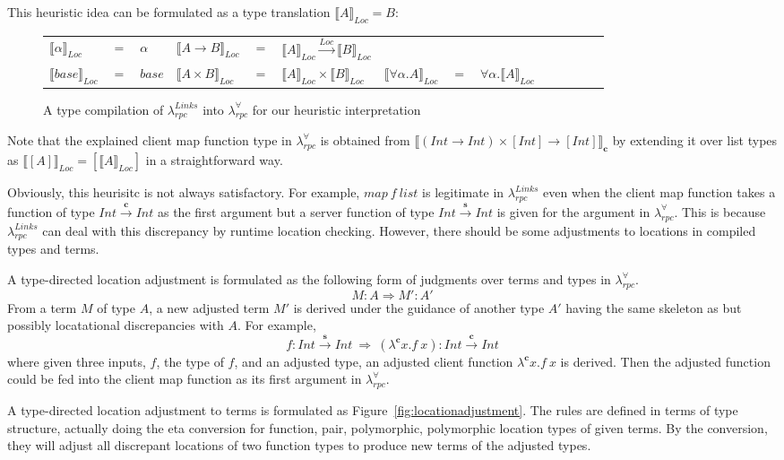 \documentclass[a4paper]{article}
\theoremstyle{plain}
\theoremstyle{definition}
\newcommand{\polyrpc}{$\lambda_{rpc}^{\forall}$\xspace}
\newcommand{\linksrpc}{$\lambda_{rpc}^{Links}$\xspace}
\newcommand{\client}{\textbf{c}}
\newcommand{\server}{\textbf{s}}
\newcommand{\lamL}[3]{\lambda^{#1}#2.#3}
\newcommand{\funL}[1]{\xrightarrow{#1}}
\newcommand{\linkstycomp}[2]{\llbracket#1\rrbracket_{#2}}
\newcommand{\adjcomp}[4]{#1:#2 \Rightarrow #3:#4}
\newcommand{\Loc}{Loc}
\begin{document}
%
This heuristic idea can be formulated as a type translation
$\linkstycomp{A}{\Loc} = B$:

\begin{figure}[h]
\centering
\begin{tabular}{l l l l l l l l l l l l l l}
$\linkstycomp{\alpha}{\Loc}$ & $=$ & $\alpha$
&
$\linkstycomp{A \funL{} B}{\Loc}$ & $=$ & $\linkstycomp{A}{\Loc} \funL{Loc} \linkstycomp{B}{\Loc}$
\\
$\linkstycomp{base}{\Loc}$ & $=$ & $base$
&
$\linkstycomp{A\times B}{\Loc}$ & $=$ & $\linkstycomp{A}{\Loc}\times \linkstycomp{B}{\Loc}$
&
$\linkstycomp{\forall\alpha.A}{\Loc}$ & $=$ & $\forall\alpha.\linkstycomp{A}{\Loc}$
\\
\end{tabular}
\caption{A type compilation of \linksrpc into \polyrpc for our heuristic interpretation}
\label{fig:typecompilation}
\end{figure}

Note that the explained client map function type in \polyrpc is
obtained from $\linkstycomp{(Int \rightarrow Int) \times [Int] \rightarrow
  [Int]}{\client}$ by extending it over list types as
$\linkstycomp{[A]}{\Loc} = [ \linkstycomp{A}{\Loc} ]$ in a straightforward way.

Obviously, this heurisitc is not always satisfactory.
%
For example, $map \ f \ list$ is legitimate in \linksrpc even when the
client map function takes a function of type $Int \funL{\client} Int$
as the first argument but a server function of type $Int
\funL{\server} Int$ is given for the argument in \polyrpc.
%
This is because \linksrpc can deal with this discrepancy by runtime
location checking.
%
However, there should be some adjustments to locations in compiled
types and terms.

A type-directed location adjustment is formulated as the following
form of judgments over terms and types in \polyrpc.
\[
\adjcomp{M}{A}{M'}{A'}
\]
From a term $M$ of type $A$, a new adjusted term $M'$ is
derived under the guidance of another type $A'$ having the same
skeleton as but possibly locatational discrepancies with $A$.
%
For example,
\[
\adjcomp{f}{Int \funL{\server} Int \ }{\ (\lamL{\client}{x}{f
    \ x})}{Int \funL{\client} Int}
\]
where given three inputs, $f$, the type of $f$, and an adjusted type,
an adjusted client function $\lamL{\client}{x}{f \ x}$ is derived.
%
Then the adjusted function could be fed into the client map function
as its first argument in \polyrpc.

A type-directed location adjustment to terms is formulated as
Figure~\ref{fig:locationadjustment}.
%
The rules are defined in terms of type structure, actually doing the
eta conversion for function, pair, polymorphic, polymorphic location
types of given terms.
%
By the conversion, they will adjust all discrepant locations of two
function types to produce new terms of the adjusted types.
%
\end{document}
